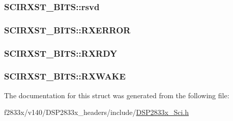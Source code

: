 \subsubsection[{rsvd}]{ S\+C\+I\+R\+X\+S\+T\+\_\+\+B\+I\+T\+S\+::rsvd}\label{struct_s_c_i_r_x_s_t___b_i_t_s_a94e41dd6ba5e5be3d63c52db6e9a5fa5}
\hypertarget{struct_s_c_i_r_x_s_t___b_i_t_s_a2bd58567c90a377aa8f7261f7fe35275}{}
\subsubsection[{R\+X\+E\+R\+R\+O\+R}]{ S\+C\+I\+R\+X\+S\+T\+\_\+\+B\+I\+T\+S\+::\+R\+X\+E\+R\+R\+O\+R}\label{struct_s_c_i_r_x_s_t___b_i_t_s_a2bd58567c90a377aa8f7261f7fe35275}
\hypertarget{struct_s_c_i_r_x_s_t___b_i_t_s_a8a137e6a747464d144dc0a6a39f42143}{}
\subsubsection[{R\+X\+R\+D\+Y}]{ S\+C\+I\+R\+X\+S\+T\+\_\+\+B\+I\+T\+S\+::\+R\+X\+R\+D\+Y}\label{struct_s_c_i_r_x_s_t___b_i_t_s_a8a137e6a747464d144dc0a6a39f42143}
\hypertarget{struct_s_c_i_r_x_s_t___b_i_t_s_a924f49b75a354701a7b1aa0914b727dd}{}
\subsubsection[{R\+X\+W\+A\+K\+E}]{ S\+C\+I\+R\+X\+S\+T\+\_\+\+B\+I\+T\+S\+::\+R\+X\+W\+A\+K\+E}\label{struct_s_c_i_r_x_s_t___b_i_t_s_a924f49b75a354701a7b1aa0914b727dd}


The documentation for this struct was generated from the following file\+:\begin{DoxyCompactItemize}
\item 
f2833x/v140/\+D\+S\+P2833x\+\_\+headers/include/\hyperlink{_d_s_p2833x___sci_8h}{D\+S\+P2833x\+\_\+\+Sci.\+h}\end{DoxyCompactItemize}
